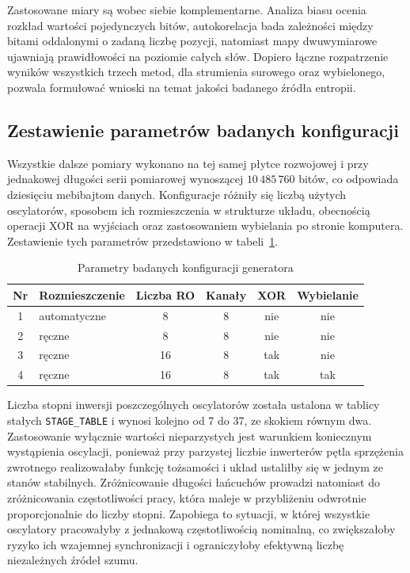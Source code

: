 Zastosowane miary są wobec siebie komplementarne. Analiza biasu ocenia rozkład
wartości pojedynczych bitów, autokorelacja bada zależności między bitami
oddalonymi o zadaną liczbę pozycji, natomiast mapy dwuwymiarowe ujawniają
prawidłowości na poziomie całych słów. Dopiero łączne rozpatrzenie wyników
wszystkich trzech metod, dla strumienia surowego oraz wybielonego, pozwala
formułować wnioski na temat jakości badanego źródła entropii.

\subsection{Zestawienie parametrów badanych konfiguracji}

Wszystkie dalsze pomiary wykonano na tej samej płytce rozwojowej i przy jednakowej
długości serii pomiarowej wynoszącej $10\,485\,760$ bitów, co odpowiada dziesięciu
mebibajtom danych. Konfiguracje różniły się liczbą użytych oscylatorów, sposobem ich
rozmieszczenia w strukturze układu, obecnością operacji XOR na wyjściach oraz
zastosowaniem wybielania po stronie komputera. Zestawienie tych parametrów przedstawiono
w tabeli~\ref{tab:konfiguracje}.

\begin{table}[htbp]
    \centering
    \caption{Parametry badanych konfiguracji generatora}
    \label{tab:konfiguracje}
    \small
    \begin{tabular}{clcccc}
        \toprule
        Nr & Rozmieszczenie & Liczba RO & Kanały & XOR & Wybielanie \\
        \midrule
        1 & automatyczne & 8  & 8 & nie  & nie \\
        2 & ręczne       & 8  & 8 & nie  & nie \\
        3 & ręczne       & 16 & 8 & tak  & nie \\
        4 & ręczne       & 16 & 8 & tak  & tak \\
        \bottomrule
    \end{tabular}
\end{table}

Liczba stopni inwersji poszczególnych oscylatorów została ustalona w tablicy stałych
\texttt{STAGE\_TABLE} i wynosi kolejno od 7 do 37, ze skokiem równym dwa. Zastosowanie
wyłącznie wartości nieparzystych jest warunkiem koniecznym wystąpienia oscylacji,
ponieważ przy parzystej liczbie inwerterów pętla sprzężenia zwrotnego realizowałaby
funkcję tożsamości i układ ustaliłby się w jednym ze stanów stabilnych. Zróżnicowanie
długości łańcuchów prowadzi natomiast do zróżnicowania częstotliwości pracy, która maleje
w przybliżeniu odwrotnie proporcjonalnie do liczby stopni. Zapobiega to sytuacji,
w której wszystkie oscylatory pracowałyby z jednakową częstotliwością nominalną, co
zwiększałoby ryzyko ich wzajemnej synchronizacji i ograniczyłoby efektywną liczbę
niezależnych źródeł szumu.

